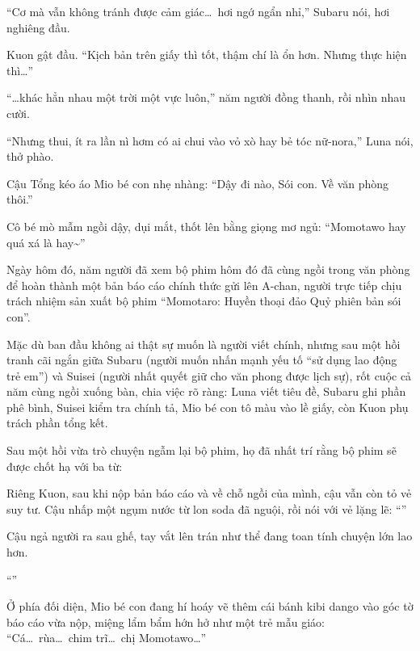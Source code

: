 \documentclass[../main.tex]{subfiles}
\begin{document}
``Cơ mà vẫn không tránh được cảm giác\dots\ hơi ngớ ngẩn nhỉ,'' Subaru nói, hơi nghiêng đầu.

Kuon gật đầu. ``Kịch bản trên giấy thì tốt, thậm chí là ổn hơn. Nhưng thực hiện thì\dots''

``\dots khác hẳn nhau một trời một vực luôn,'' năm người đồng thanh, rồi nhìn nhau cười.

``Nhưng thui, ít ra lần nì hơm có ai chui vào vỏ xò hay bẻ tóc nữ-nora,'' Luna nói, thở phào.

Cậu Tổng kéo áo Mio bé con nhẹ nhàng: ``Dậy đi nào, Sói con. Về văn phòng thôi.''

Cô bé mò mẫm ngồi dậy, dụi mắt, thốt lên bằng giọng mơ ngủ: ``Momotawo hay quá xá là hay\~{}''

\ct

Ngày hôm đó, năm người đã xem bộ phim hôm đó đã cùng ngồi trong văn phòng để hoàn thành một bản báo cáo chính thức gửi lên A-chan, người trực tiếp chịu trách nhiệm sản xuất bộ phim ``Momotaro: Huyền thoại đảo Quỷ phiên bản sói con''.

Mặc dù ban đầu không ai thật sự muốn là người viết chính, nhưng sau một hồi tranh cãi ngắn giữa Subaru (người muốn nhấn mạnh yếu tố ``sử dụng lao động trẻ em'') và Suisei (người nhất quyết giữ cho văn phong được lịch sự), rốt cuộc cả năm cùng ngồi xuống bàn, chia việc rõ ràng: Luna viết tiêu đề, Subaru ghi phần phê bình, Suisei kiểm tra chính tả, Mio bé con tô màu vào lề giấy, còn Kuon phụ trách phần tổng kết.

Sau một hồi vừa trò chuyện ngẫm lại bộ phim, họ đã nhất trí rằng bộ phim sẽ được chốt hạ với ba từ:


Riêng Kuon, sau khi nộp bản báo cáo và về chỗ ngồi của mình, cậu vẫn còn tỏ vẻ suy tư. Cậu nhấp một ngụm nước từ lon soda đã nguội, rồi nói với vẻ lặng lẽ: ``''

Cậu ngả người ra sau ghế, tay vắt lên trán như thể đang toan tính chuyện lớn lao hơn.

``''


Ở phía đối diện, Mio bé con đang hí hoáy vẽ thêm cái bánh kibi dango vào góc tờ báo cáo vừa nộp, miệng lẩm bẩm hớn hở như một trẻ mẫu giáo: ``Cá\dots\ rùa\dots\ chim trĩ\dots\ chị Momotawo\dots''
\end{document}
